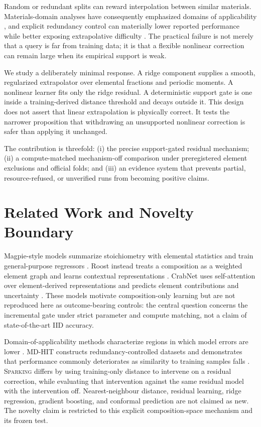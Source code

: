 \documentclass[11pt]{article}
\newcommand{\method}{\textsc{Sparking}}
\begin{document}
Random or redundant splits can reward interpolation between similar materials.
Materials-domain analyses have consequently emphasized domains of applicability
\citep{sutton2020domains}, and explicit redundancy control can materially lower
reported performance while better exposing extrapolative difficulty
\citep{li2024mdhit}. The practical failure is not merely that a query is far
from training data; it is that a flexible nonlinear correction can remain large
when its empirical support is weak.

We study a deliberately minimal response. A ridge component supplies a smooth,
regularized extrapolator over elemental fractions and periodic moments. A
nonlinear learner fits only the ridge residual. A deterministic support gate is
one inside a training-derived distance threshold and decays outside it. This
design does not assert that linear extrapolation is physically correct. It tests
the narrower proposition that withdrawing an unsupported nonlinear correction
is safer than applying it unchanged.

The contribution is threefold: (i) the precise support-gated residual mechanism;
(ii) a compute-matched mechanism-off comparison under preregistered element
exclusions and official folds; and (iii) an evidence system that prevents
partial, resource-refused, or unverified runs from becoming positive claims.

\section{Related Work and Novelty Boundary}
Magpie-style models summarize stoichiometry with elemental statistics and train
general-purpose regressors \citep{ward2016magpie}. Roost instead treats a
composition as a weighted element graph and learns contextual representations
\citep{goodall2020roost}. CrabNet uses self-attention over element-derived
representations and predicts element contributions and uncertainty
\citep{wang2021crabnet}. These models motivate composition-only learning but are
not reproduced here as outcome-bearing controls: the central question concerns
the incremental gate under strict parameter and compute matching, not a claim
of state-of-the-art IID accuracy.

Domain-of-applicability methods characterize regions in which model errors are
lower \citep{sutton2020domains}. MD-HIT constructs redundancy-controlled
datasets and demonstrates that performance commonly deteriorates as similarity
to training samples falls \citep{li2024mdhit}. \method{} differs by using
training-only distance to intervene on a residual correction, while evaluating
that intervention against the same residual model with the intervention off.
Nearest-neighbour distance, residual learning, ridge regression, gradient
boosting, and conformal prediction are not claimed as new. The novelty claim is
restricted to this explicit composition-space mechanism and its frozen test.
\end{document}
